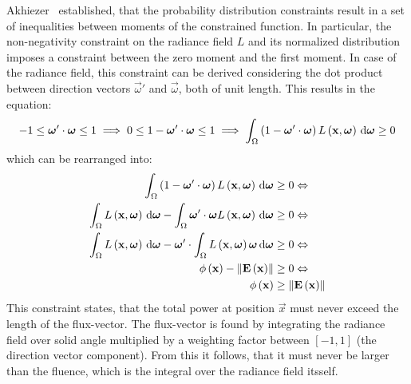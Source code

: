 Akhiezer~\cite{Akhiezer65} established, that the probability distribution constraints result in a set of inequalities between moments of the constrained function. In particular, the non-negativity constraint on the radiance field $L$ and its normalized distribution imposes a constraint between the zero moment and the first moment. In case of the radiance field, this constraint can be derived considering the dot product between direction vectors $\vec{\omega}'$ and $\vec{\omega}$, both of unit length. This results in the equation:
\begin{align*}
-1 \le \boldsymbol{\mathbf{\omega}}'\cdot\boldsymbol{\mathbf{\omega}} \le 1
\implies
0 \le 1 - \boldsymbol{\mathbf{\omega}}'\cdot\boldsymbol{\mathbf{\omega}} \le 1
\implies
\int_{\Omega}{\left(1-\boldsymbol{\mathbf{\omega}}'\cdot\boldsymbol{\mathbf{\omega}}\right)L\left(\boldsymbol{\mathbf{x}}, \boldsymbol{\mathbf{\omega}}\right)\,\mathrm{d}\boldsymbol{\mathbf{\omega}}}\ge 0
\end{align*}
which can be rearranged into:
\begin{align*}
\int_{\Omega}{\left(1-\boldsymbol{\mathbf{\omega}}'\cdot\boldsymbol{\mathbf{\omega}}\right)L\left(\boldsymbol{\mathbf{x}}, \boldsymbol{\mathbf{\omega}}\right)\,\mathrm{d}\boldsymbol{\mathbf{\omega}}} &\ge 0
\Leftrightarrow
\\
\int_{\Omega}{L\left(\boldsymbol{\mathbf{x}}, \boldsymbol{\mathbf{\omega}}\right)\,\mathrm{d}\boldsymbol{\mathbf{\omega}}}
-\int_{\Omega}{\boldsymbol{\mathbf{\omega}}'\cdot\boldsymbol{\mathbf{\omega}} L\left(\boldsymbol{\mathbf{x}}, \boldsymbol{\mathbf{\omega}}\right)\,\mathrm{d}\boldsymbol{\mathbf{\omega}}}
&\ge 0
\Leftrightarrow
\\
\int_{\Omega}{L\left(\boldsymbol{\mathbf{x}}, \boldsymbol{\mathbf{\omega}}\right)\,\mathrm{d}\boldsymbol{\mathbf{\omega}}}
-\boldsymbol{\mathbf{\omega}}'\cdot\int_{\Omega}{L\left(\boldsymbol{\mathbf{x}}, \boldsymbol{\mathbf{\omega}}\right)\boldsymbol{\mathbf{\omega}}\,\mathrm{d}\boldsymbol{\mathbf{\omega}}}
&\ge 0
\Leftrightarrow
\\
\phi\left(\boldsymbol{\mathbf{x}}\right)
-\left\lVert\boldsymbol{\mathbf{E}}\left(\boldsymbol{\mathbf{x}}\right)\right\rVert
&\ge 0
\Leftrightarrow
\\
\phi\left(\boldsymbol{\mathbf{x}}\right)
&\ge \left\lVert\boldsymbol{\mathbf{E}}\left(\boldsymbol{\mathbf{x}}\right)\right\rVert
\end{align*}
This constraint states, that the total power at position $\vec{x}$ must never exceed the length of the flux-vector. The flux-vector is found by integrating the radiance field over solid angle multiplied by a weighting factor between $\left[-1, 1\right]$ (the direction vector component). From this it follows, that it must never be larger than the fluence, which is the integral over the radiance field itsself.

